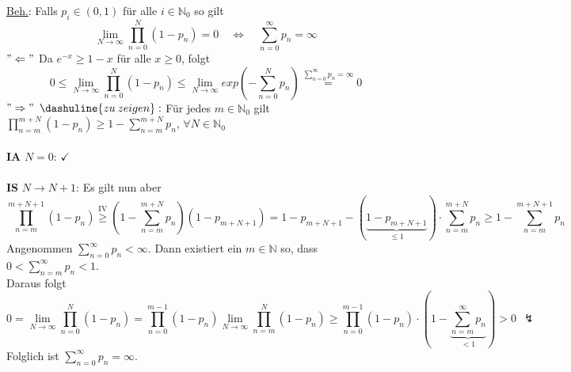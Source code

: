 \underline{Beh.}: Falls $p_{i} \in (0,1)$ für alle $i \in \mathbb{N}_{0}$ so gilt
\begin{equation*}
\lim_{N \to \infty} \prod_{n=0}^{N} (1-p_{n}) = 0 \quad \Leftrightarrow \quad \sum_{n=0}^{\infty} p_{n} = \infty
\end{equation*}
$"\Leftarrow"$ Da $e^{-x} \geq 1-x$ für alle $x \geq 0$, folgt
\begin{equation*}
0 \leq \lim_{N \to \infty} \prod_{n=0}^{N} (1-p_{n}) \leq \lim_{N \to \infty} exp(-\sum_{n=0}^{N}p_{n}) \stackrel{\sum_{n=0}^{\infty}p_{n} = \infty}{=} 0
\end{equation*}
$"\Rightarrow"$ $\dashuline{zu \: zeigen}:$ Für jedes $m \in \mathbb{N}_{0}$ gilt $\prod_{n=m}^{m+N}(1-p_{n}) \geq 1 - \sum_{n=m}^{m+N}p_{n}$, $\forall N \in \mathbb{N}_{0}$
\\
\\
\textbf{IA} $N=0$: $\checkmark$
\\
\\
\textbf{IS} $N \to N+1$: Es gilt nun aber
\begin{equation*}
\prod_{n=m}^{m+N+1} (1-p_{n}) \stackrel{\mathrm{IV}}{\geq} (1 - \sum_{n=m}^{m+N}p_{n})(1-p_{m+N+1}) = 1 - p_{m+N+1} - (\underbrace{1-p_{m+N+1}}_{\leq 1}) \cdot \sum_{n=m}^{m+N}p_{n} \geq 1 - \sum_{n=m}^{m+N+1} p_{n}
\end{equation*}
Angenommen $\sum_{n=0}^{\infty}p_{n} < \infty$. Dann existiert ein $m \in \mathbb{N}$ so, dass $0 < \sum_{n=m}^{\infty} p_{n} < 1$.
\\
Daraus folgt
\begin{equation*}
0 = \lim_{N \to \infty} \prod_{n=0}^{N} (1-p_{n}) = \prod_{n=0}^{m-1} (1-p_{n})  \lim_{N \to \infty} \prod_{n=m}^{N} (1-p_{n}) \geq \prod_{n=0}^{m-1} (1-p_{n}) \cdot (1 - \underbrace{\sum_{n=m}^{\infty} p_{n}}_{<1}) > 0 \: \: \lightning
\end{equation*}
Folglich ist $\sum_{n=0}^{\infty} p_{n} = \infty$.

